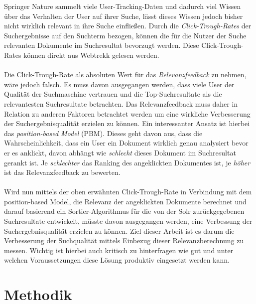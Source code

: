 Springer Nature sammelt viele User-Tracking-Daten und dadurch viel Wissen über das Verhalten der User auf ihrer Suche, lässt dieses Wissen jedoch bisher nicht wirklich relevant in ihre Suche einfließen. Durch die \textit{Click-Trough-Rates} der Suchergebnisse auf den Suchterm bezogen, können die für die Nutzer der Suche relevanten Dokumente im Suchresultat bevorzugt werden. Diese Click-Trough-Rates können direkt aus Webtrekk gelesen werden. 
\\
\\
Die Click-Trough-Rate als absoluten Wert für das \textit{Relevanzfeedback} zu nehmen, wäre jedoch falsch. Es muss davon ausgegangen werden, dass viele User der Qualität der Suchmaschine vertrauen und die Top-Suchresultate als die relevantesten Suchresultate betrachten. \cite{Joachims} Das Relevanzfeedback muss daher in Relation zu anderen Faktoren betrachtet werden um eine wirkliche Verbesserung der Suchergebnisqualität erzielen zu können. Ein interessanter Ansatz ist hierbei das \textit{position-based Model} (PBM). \cite{chuklin2015} Dieses geht davon aus, dass die Wahrscheinlichkeit, dass ein User ein Dokument wirklich genau analysiert bevor er es anklickt, davon abhängt wie \textit{schlecht} dieses Dokument im Suchresultat gerankt ist. Je \textit{schlechter} das Ranking des angeklickten Dokumentes ist, je \textit{höher} ist das Relevanzfeedback zu bewerten.
\\
\\
Wird nun mittels der oben erwähnten Click-Trough-Rate in Verbindung mit dem position-based Model, die Relevanz der angeklickten Dokumente berechnet und darauf basierend ein Sortier-Algorithmus für die von der Solr zurückgegebenen Suchresultate entwickelt, müsste davon ausgegangen werden, eine Verbessung der Suchergebnisqualität erzielen zu können. Ziel dieser Arbeit ist es darum die Verbesserung der Suchqualität mittels Einbezug dieser Relevanzberechnung zu messen. Wichtig ist hierbei auch kritisch zu hinterfragen wie gut und unter welchen Voraussetzungen diese Lösung produktiv eingesetzt werden kann.

\section{Methodik}
\label{sec:Einfuehrung:Methodik}

